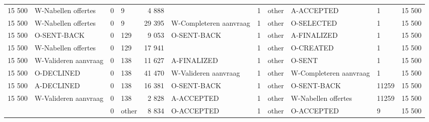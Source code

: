\begin{tabular}{llllrlllllr}
15 500 & W-Nabellen offertes & 0 & 9 & 4 888 &  & 1 & other & A-ACCEPTED & 1 & 15 500 \\
15 500 & W-Nabellen offertes & 0 & 9 & 29 395 & W-Completeren aanvraag & 1 & other & O-SELECTED & 1 & 15 500 \\
15 500 & O-SENT-BACK & 0 & 129 & 9 053 & O-SENT-BACK & 1 & other & A-FINALIZED & 1 & 15 500 \\
15 500 & W-Nabellen offertes & 0 & 129 & 17 941 &  & 1 & other & O-CREATED & 1 & 15 500 \\
15 500 & W-Valideren aanvraag & 0 & 138 & 11 627 & A-FINALIZED & 1 & other & O-SENT & 1 & 15 500 \\
15 500 & O-DECLINED & 0 & 138 & 41 470 & W-Valideren aanvraag & 1 & other & W-Completeren aanvraag & 1 & 15 500 \\
15 500 & A-DECLINED & 0 & 138 & 16 381 & O-SENT-BACK & 1 & other & O-SENT-BACK & 11259 & 15 500 \\
15 500 & W-Valideren aanvraag & 0 & 138 & 2 828 & A-ACCEPTED & 1 & other & W-Nabellen offertes & 11259 & 15 500 \\
 &  & 0 & other & 8 834 & O-ACCEPTED & 1 & other & O-ACCEPTED & 9 & 15 500 \\
\bottomrule
\end{tabular}
